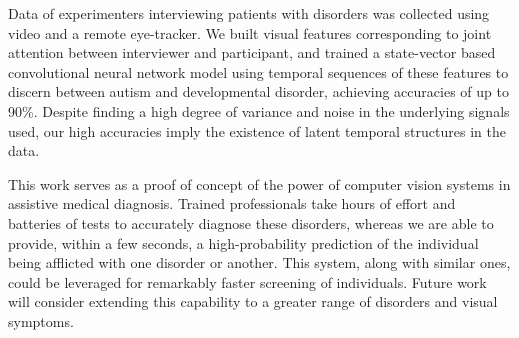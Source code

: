 \documentclass[10pt,twocolumn,letterpaper]{article}
\begin{document}
Data of experimenters interviewing patients with disorders was collected using video and a remote eye-tracker. We built visual features corresponding to joint attention between interviewer and participant, and trained a state-vector based convolutional neural network model using temporal sequences of these features to discern between autism and developmental disorder, achieving accuracies of up to 90\%. Despite finding a high degree of variance and noise in the underlying signals used, our high accuracies imply the existence of latent temporal structures in the data. 


This work serves as a proof of concept of the power of computer vision systems in assistive medical diagnosis. Trained professionals take hours of effort and batteries of tests to accurately diagnose these disorders, whereas we are able to provide, within a few seconds, a high-probability prediction of the individual being afflicted with one disorder or another. This system, along with similar ones, could be leveraged for remarkably faster screening of individuals. Future work will consider extending this capability to a greater range of disorders and visual symptoms.

\newpage

{\small


}
\end{document}
